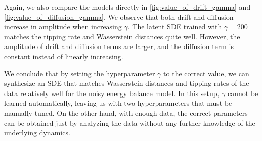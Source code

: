 \documentclass[twoside,11pt]{article}
\begin{document}
Again, we also compare the models directly in \cref{fig:value_of_drift_gamma} and \cref{fig:value_of_diffusion_gamma}. We observe that both drift and diffusion increase in amplitude when increasing \(\gamma\). The latent SDE trained with \(\gamma = 200\) matches the tipping rate and Wasserstein distances quite well. However, the amplitude of drift and diffusion terms are larger, and the diffusion term is constant instead of linearly increasing.

We conclude that by setting the hyperparameter \(\gamma\) to the correct value, we can synthesize an SDE that matches Wasserstein distances and tipping rates of the data relatively well for the noisy energy balance model. In this setup, \(\gamma\) cannot be learned automatically, leaving us with two hyperparameters that must be manually tuned. On the other hand, with enough data, the correct parameters can be obtained just by analyzing the data without any further knowledge of the underlying dynamics.






\end{document}
